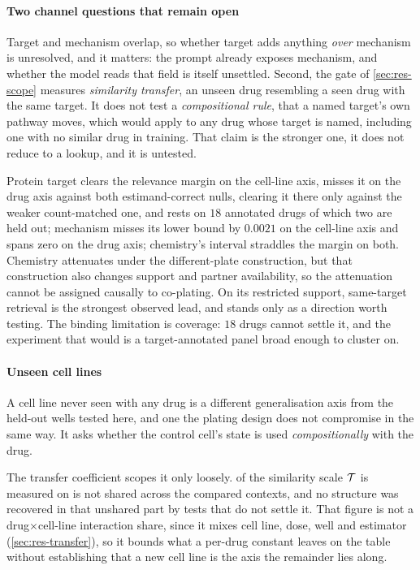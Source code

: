 \paragraph{Two channel questions that remain open} Target and mechanism overlap,
so whether target adds anything \emph{over} mechanism is unresolved, and it
matters: the prompt already exposes mechanism, and whether the model reads that
field is itself unsettled. Second, the gate of \cref{sec:res-scope}
measures \emph{similarity transfer}, an unseen drug resembling a seen drug with
the same target. It does not test a \emph{compositional rule}, that a named
target's own pathway moves, which would apply to any drug whose target is named,
including one with no similar drug in training. That claim is the stronger one,
it does not reduce to a lookup, and it is untested.

Protein target clears the relevance margin on the cell-line axis, misses it on
the drug axis against both estimand-correct nulls, clearing it there only
against the weaker count-matched one, and rests on $18$ annotated drugs of which
two are held out; mechanism misses its lower bound by $0.0021$ on the cell-line
axis and spans zero on the drug axis; chemistry's interval straddles the margin
on both. Chemistry attenuates under the different-plate construction, but that
construction also changes support and partner availability, so the attenuation
cannot be assigned causally to co-plating. On its restricted support, same-target
retrieval is the strongest observed lead, and stands only as a direction worth
testing. The binding limitation is coverage: $18$ drugs cannot settle it, and
the experiment that would is a target-annotated panel broad enough to cluster
on.

\paragraph{Unseen cell lines} A cell line never seen with any drug is a
different generalisation axis from the held-out wells tested here, and one the
plating design does not compromise in the same way. It asks whether the control
cell's state is used \emph{compositionally} with the
drug.

The transfer coefficient scopes it only loosely.  of
the similarity scale $\mathcal{T}$ is measured on is not shared across the compared
contexts, and no structure was recovered in that unshared part by tests that do
not settle it. That figure is not a drug$\times$cell-line interaction share,
since it mixes cell line, dose, well and estimator (\cref{sec:res-transfer}), so
it bounds what a per-drug constant leaves on the table without establishing that
a new cell line is the axis the remainder lies along.

